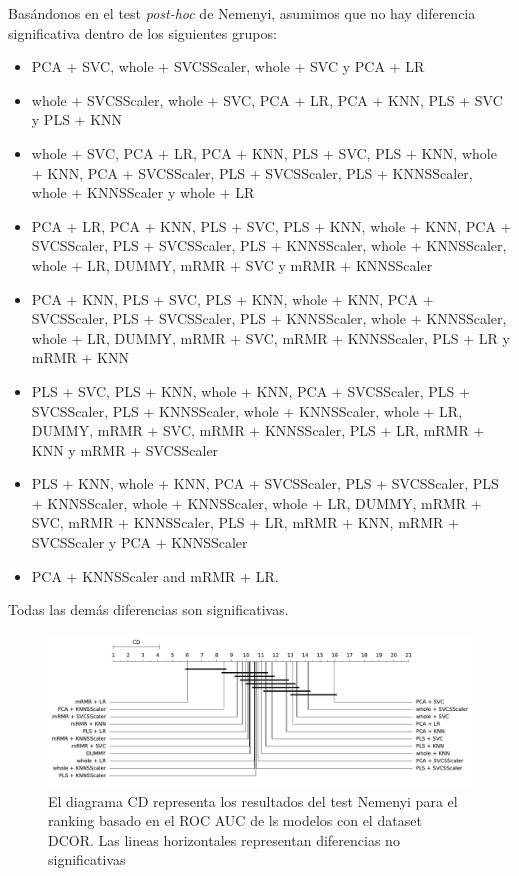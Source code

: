 \documentclass[a4paper,oneside,11pt,leqno]{article}
\begin{document}
	Basándonos en el test \textit{post-hoc} de Nemenyi, asumimos que no hay diferencia significativa dentro de los siguientes grupos:
	
	\begin{itemize}
		\item  PCA + SVC, whole + SVCSScaler, whole + SVC y PCA + LR
		
		\item  whole + SVCSScaler, whole + SVC, PCA + LR, PCA + KNN, PLS + SVC y PLS + KNN
		
		\item whole + SVC, PCA + LR, PCA + KNN, PLS + SVC, PLS + KNN, whole + KNN, PCA + SVCSScaler, PLS + SVCSScaler, PLS + KNNSScaler, whole + KNNSScaler y whole + LR
		
		\item  PCA + LR, PCA + KNN, PLS + SVC, PLS + KNN, whole + KNN, PCA + SVCSScaler, PLS + SVCSScaler, PLS + KNNSScaler, whole + KNNSScaler, whole + LR, DUMMY, mRMR + SVC y mRMR + KNNSScaler
		
		\item  PCA + KNN, PLS + SVC, PLS + KNN, whole + KNN, PCA + SVCSScaler, PLS + SVCSScaler, PLS + KNNSScaler, whole + KNNSScaler, whole + LR, DUMMY, mRMR + SVC, mRMR + KNNSScaler, PLS + LR y mRMR + KNN
		
		\item  PLS + SVC, PLS + KNN, whole + KNN, PCA + SVCSScaler, PLS + SVCSScaler, PLS + KNNSScaler, whole + KNNSScaler, whole + LR, DUMMY, mRMR + SVC, mRMR + KNNSScaler, PLS + LR, mRMR + KNN y mRMR + SVCSScaler
		
		\item PLS + KNN, whole + KNN, PCA + SVCSScaler, PLS + SVCSScaler, PLS + KNNSScaler, whole + KNNSScaler, whole + LR, DUMMY, mRMR + SVC, mRMR + KNNSScaler, PLS + LR, mRMR + KNN, mRMR + SVCSScaler y PCA + KNNSScaler
		
		\item PCA + KNNSScaler and mRMR + LR.  
	\end{itemize}
	
	Todas las demás diferencias son significativas.
	
	\begin{figure}[h]
		\includegraphics[width=\linewidth]{stat_results_dcor.pdf}
		\caption{El diagrama CD representa los resultados del test Nemenyi para el ranking basado en el ROC AUC de ls modelos con el dataset DCOR. Las lineas horizontales representan diferencias no significativas}
		\label{fig:stats_fig_dcor}
	\end{figure}
	
\end{document}
